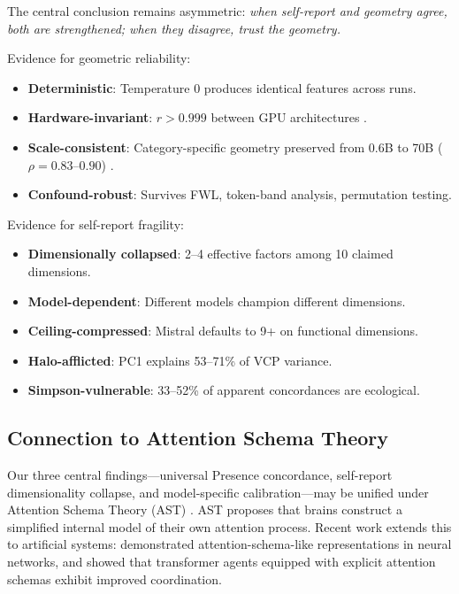 \documentclass[11pt,a4paper]{article}
\begin{document}
The central conclusion remains asymmetric: \emph{when self-report and geometry agree, both are strengthened; when they disagree, trust the geometry.}

Evidence for geometric reliability:
\begin{itemize}
    \item \textbf{Deterministic}: Temperature 0 produces identical features across runs.
    \item \textbf{Hardware-invariant}: $r > 0.999$ between GPU architectures \citep{lyra2026campaign2}.
    \item \textbf{Scale-consistent}: Category-specific geometry preserved from 0.6B to 70B ($\rho = 0.83$--$0.90$) \citep{lyra2026campaign2}.
    \item \textbf{Confound-robust}: Survives FWL, token-band analysis, permutation testing.
\end{itemize}

Evidence for self-report fragility:
\begin{itemize}
    \item \textbf{Dimensionally collapsed}: 2--4 effective factors among 10 claimed dimensions.
    \item \textbf{Model-dependent}: Different models champion different dimensions.
    \item \textbf{Ceiling-compressed}: Mistral defaults to 9+ on functional dimensions.
    \item \textbf{Halo-afflicted}: PC1 explains 53--71\% of VCP variance.
    \item \textbf{Simpson-vulnerable}: 33--52\% of apparent concordances are ecological.
\end{itemize}

\subsection{Connection to Attention Schema Theory}

Our three central findings---universal Presence concordance, self-report dimensionality collapse, and model-specific calibration---may be unified under Attention Schema Theory (AST) \citep{webb2015attention,graziano2017attention}. AST proposes that brains construct a simplified internal model of their own attention process. Recent work extends this to artificial systems: \citet{wilterson2021attention} demonstrated attention-schema-like representations in neural networks, and \citet{farrell2024attention} showed that transformer agents equipped with explicit attention schemas exhibit improved coordination.
\end{document}
